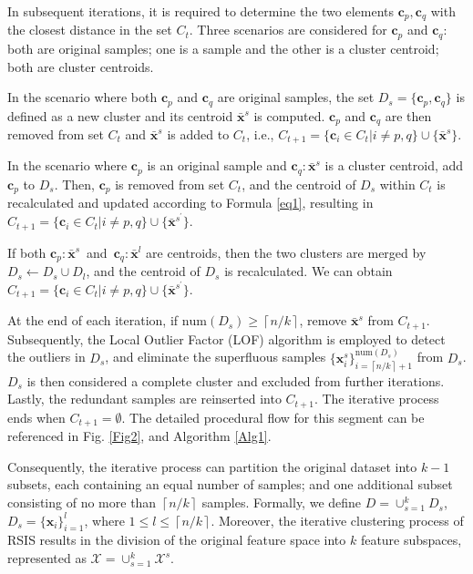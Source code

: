 \documentclass[lettersize,journal]{IEEEtran}
\begin{document}
In subsequent iterations, it is required to determine the two 
elements $\boldsymbol{c}_p,\boldsymbol{c}_q$ with the closest 
distance in the set $C_t$. Three scenarios are considered 
for $\boldsymbol{c}_p$ and $\boldsymbol{c}_q$: both are 
original samples; one is a sample and the other is a cluster 
centroid; both are cluster centroids.

In the scenario where both $\boldsymbol{c}_p$ and $
\boldsymbol{c}_q$ are original samples, the set $D_s=\{
  \boldsymbol{c}_p,\boldsymbol{c}_q\}$ is defined as a new cluster 
  and its centroid $\bar{\boldsymbol{x}}^s$ is computed. 
  $\boldsymbol{c}_p$ and $\boldsymbol{c}_q$ are then removed 
  from set $C_t$ and $\bar{\boldsymbol{x}}^s$ is added to $C_t$, i.e.,
   $C_{t+1}=\{\boldsymbol{c}_i \in C_{t} | i \neq p, q\} \cup 
   \{\bar{\boldsymbol{x}}^s\}$.

In the scenario where $\boldsymbol{c}_p$ is an original sample and 
$\boldsymbol{c}_q:{\bar{\boldsymbol{x}}^s}$ is a cluster centroid, 
add $\boldsymbol{c}_p$ to $D_s$. Then, $\boldsymbol{c}_p$ is removed 
from set $C_t$, and the centroid of $D_s$ within $C_t$ is 
recalculated and updated according to Formula \eqref{eq1}, resulting in 
$C_{t+1}=\{\boldsymbol{c}_i \in C_{t} | i \neq p, q\}\cup \{ 
  \bar{\boldsymbol{x}}^{s^\prime} \}$.

If both $\boldsymbol{c}_p:{\bar{\boldsymbol{x}}^s}$ and $
\boldsymbol{c}_q:{\bar{\boldsymbol{x}}^l}$ are centroids, then 
the two clusters are merged by $D_s \leftarrow D_s  
{\cup}  D_l$, and the centroid of $D_s$ is recalculated. We can 
obtain $C_{t+1}=\{\boldsymbol{c}_i \in C_{t} | i \neq p, q\} \cup \{
  \bar{\boldsymbol{x}}^{s^\prime}\}$.

At the end of each iteration, if $\text{num}(D_s){\ge}\left\lceil 
n/k\right\rceil$, remove $\bar{\boldsymbol{x}}^s$ from $C_{t+1}$. 
Subsequently, the Local Outlier Factor (LOF) algorithm \cite{bib53} is 
employed to detect the outliers in $D_s$, and eliminate the 
superfluous samples $\{\boldsymbol{x}^s_i\}_{i=\left\lceil n/k
\right\rceil+1}^{\text{num}(D_s)}$ from $D_s$. $D_s$ is then 
considered a complete cluster and excluded from further iterations.
 Lastly, the redundant samples are 
 reinserted into $C_{t+1}$. The iterative process ends when 
$C_{t+1}=\emptyset$. The detailed procedural flow for this 
 segment can be referenced in Fig. \ref{Fig2}, and Algorithm \ref{Alg1}.

Consequently, the iterative process can partition the original 
dataset into $k-1$ subsets, each containing an equal number 
of samples; and one additional subset consisting of no more 
than $\left\lceil n/k\right\rceil$ samples. Formally, we 
define $D={\cup}^k_{s=1}D_s$, $D_s=\{\boldsymbol{x}_i\}_{i=1}^l$, 
where $1 {\le} l {\le} \left\lceil n/k\right\rceil$. Moreover, the 
iterative clustering process of RSIS results in the division of 
the original feature space into $k$ feature subspaces, represented 
as $\mathcal{X} = \cup_{s=1}^{k} \mathcal{X}^s$.
\end{document}
